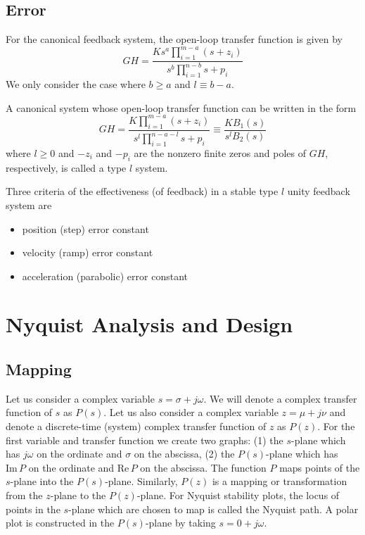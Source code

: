 \documentclass[11pt]{book}
\begin{document}
\subsection{Error}

For the canonical feedback system, the open-loop transfer function is given by
\begin{equation}
	GH=\frac{Ks^a\prod_{i=1}^{m-a}{(s+z_i)}}{s^b\prod_{i=1}^{n-b}{s+p_i}}
\end{equation}
We only consider the case where $b\geq{a}$ and $l\equiv{b-a}$.

A canonical system whose open-loop transfer function can be written in the form
\begin{equation}
	GH=\frac{K\prod_{i=1}^{m-a}{(s+z_i)}}{s^l\prod_{i=1}^{n-a-l}{s+p_i}}\equiv\frac{KB_1(s)}{s^lB_2(s)}
\end{equation}
where $l\geq{0}$ and $-z_i$ and $-p_i$ are the nonzero finite zeros and poles of $GH$, respectively, is called a type $l$ system.

Three criteria of the effectiveness (of feedback) in a stable type $l$ unity feedback system are
\begin{itemize}
	\item position (step) error constant
	\item velocity (ramp) error constant
	\item acceleration (parabolic) error constant
\end{itemize}

\section{Nyquist Analysis and Design}

\subsection{Mapping}

Let us consider a complex variable $s=\sigma+j\omega$. We will denote a complex transfer function of $s$ as $P(s)$. Let us also consider a complex variable $z=\mu+j\nu$ and denote a discrete-time (system) complex transfer function of $z$  as $P(z)$. For the first variable and transfer function we create two graphs: (1) the $s$-plane which has $j\omega$ on the ordinate and $\sigma$ on the abscissa, (2) the $P(s)$-plane which has $\mathrm{Im}\,P$ on the ordinate and $\mathrm{Re}\,P$ on the abscissa. The function $P$ maps points of the $s$-plane into the $P(s)$-plane. Similarly, $P(z)$ is a mapping or transformation from the $z$-plane to the $P(z)$-plane. For Nyquist stability plots, the locus of points in the $s$-plane which are chosen to map is called the Nyquist path. A polar plot is constructed in the $P(s)$-plane by taking $s=0+j\omega$.  
\end{document}
